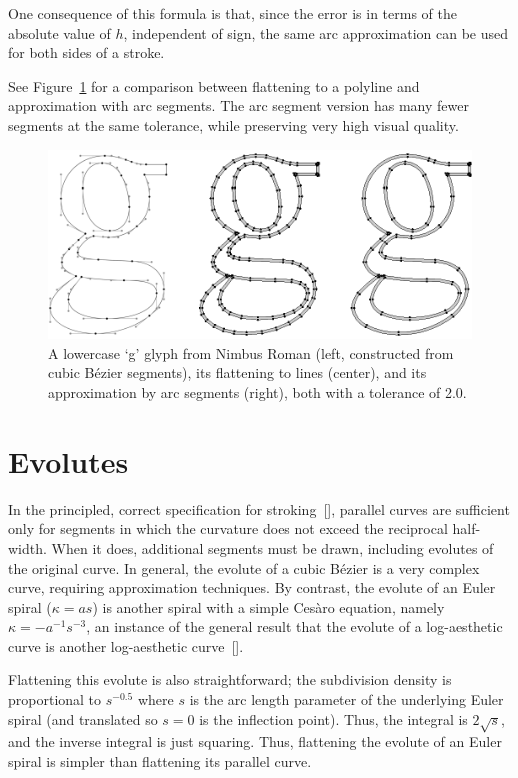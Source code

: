 \documentclass[sigconf, nonacm]{acmart}
\begin{document}
One consequence of this formula is that, since the error is in terms of the absolute value of $h$, independent of sign, the same arc approximation can be used for both sides of a stroke.

See Figure~\ref{fig:g_comparison} for a comparison between flattening to a polyline and approximation with arc segments. The arc segment version has many fewer segments at the same tolerance, while preserving very high visual quality.

\begin{figure}
    \includegraphics[scale=0.65]{g_comparison}
    \caption{A lowercase `g' glyph from Nimbus Roman (left, constructed from cubic Bézier segments), its flattening to lines (center), and its approximation by arc segments (right), both with a tolerance of 2.0.}
    \label{fig:g_comparison}
\end{figure}


\section{Evolutes}

In the principled, correct specification for stroking~[], parallel curves are sufficient only for segments in which the curvature does not exceed the reciprocal half-width. When it does, additional segments must be drawn, including evolutes of the original curve. In general, the evolute of a cubic Bézier is a very complex curve, requiring approximation techniques. By contrast, the evolute of an Euler spiral ($\kappa = as$) is another spiral with a simple Cesàro equation, namely $\kappa = -a^{-1}s^{-3}$, an instance of the general result that the evolute of a log-aesthetic curve is another log-aesthetic curve~[].

Flattening this evolute is also straightforward; the subdivision density is proportional to $s^{-0.5}$ where $s$ is the arc length parameter of the underlying Euler spiral (and translated so $s = 0$ is the inflection point). Thus, the integral is $2\sqrt{s}$, and the inverse integral is just squaring. Thus, flattening the evolute of an Euler spiral is simpler than flattening its parallel curve.
\end{document}
